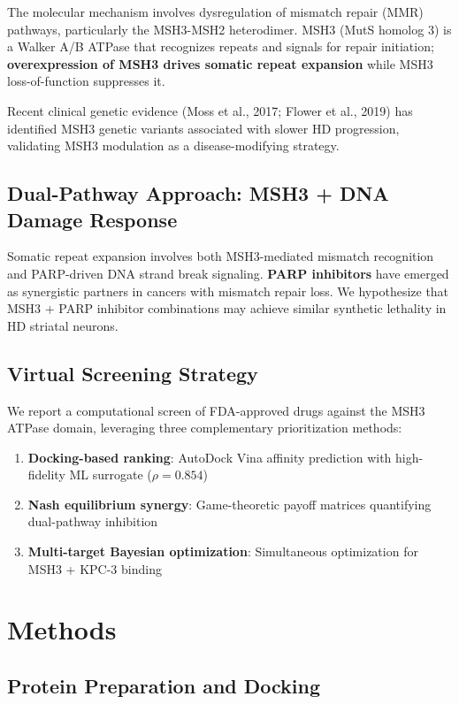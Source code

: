 \documentclass[12pt,a4paper]{article}
\begin{document}
The molecular mechanism involves dysregulation of mismatch repair (MMR) pathways, particularly the MSH3-MSH2 heterodimer. MSH3 (MutS homolog 3) is a Walker A/B ATPase that recognizes repeats and signals for repair initiation; \textbf{overexpression of MSH3 drives somatic repeat expansion} while MSH3 loss-of-function suppresses it.

Recent clinical genetic evidence (Moss et al., 2017; Flower et al., 2019) has identified MSH3 genetic variants associated with slower HD progression, validating MSH3 modulation as a disease-modifying strategy.

\subsection{Dual-Pathway Approach: MSH3 + DNA Damage Response}

Somatic repeat expansion involves both MSH3-mediated mismatch recognition and PARP-driven DNA strand break signaling. \textbf{PARP inhibitors} have emerged as synergistic partners in cancers with mismatch repair loss. We hypothesize that MSH3 + PARP inhibitor combinations may achieve similar synthetic lethality in HD striatal neurons.

\subsection{Virtual Screening Strategy}

We report a computational screen of FDA-approved drugs against the MSH3 ATPase domain, leveraging three complementary prioritization methods:

\begin{enumerate}
\item \textbf{Docking-based ranking}: AutoDock Vina affinity prediction with high-fidelity ML surrogate ($\rho=0.854$)
\item \textbf{Nash equilibrium synergy}: Game-theoretic payoff matrices quantifying dual-pathway inhibition
\item \textbf{Multi-target Bayesian optimization}: Simultaneous optimization for MSH3 + KPC-3 binding
\end{enumerate}

\section{Methods}

\subsection{Protein Preparation and Docking}
\end{document}
